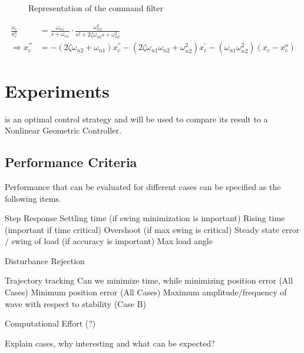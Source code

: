 \begin{figure}[h!]
	\centering
	\caption{Representation of the command filter\label{fig:CF}}
\end{figure}		

\begin{align}\label{eq:CF}
\frac{x_c}{x_c^o}&=\frac{\omega_{n1}}{s+\omega_{n1}}\cdot\frac{\omega_{n2}^2}{s^2+2\zeta\omega_{n2}s+\omega_{n2}^2}\\
\Rightarrow x_c^{'''}&=-(2\zeta\omega_{n2}+\omega_{n1})x_c^{''}-(2\zeta\omega_{n1}\omega_{n2}+\omega_{n2}^2)x_c^{'}-(\omega_{n1}\omega_{n2} ^2)(x_c-x_c^o)
\end{align}

\section{Experiments}

 is an optimal control strategy and will be used to compare its result to a Nonlinear Geometric Controller.


\subsection{Performance Criteria}
Performance  that can be evaluated for different cases can be specified as the following items.
\begin{outline}
	\1 Step Response
	\2 Settling time (if swing minimization is important)
	\2 Rising time (important if time critical)
	\2 Overshoot (if max swing is critical)
	\2 Steady state error / swing of load (if accuracy is important)
	\2 Max load angle
	
	\1 Disturbance Rejection
	
	\1 Trajectory tracking
	\2 Can we minimize time, while minimizing position error (All Cases)
	\2 Minimum position error (All Cases)
	\2 Maximum amplitude/frequency of wave with respect to stability (Case B)
	
	\1 Computational Effort (?)
\end{outline}

Explain cases, why interesting and what can be expected?\\

